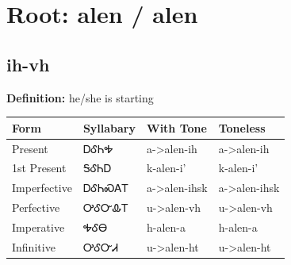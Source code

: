 \documentclass{article}%
\begin{document}
%
\normalsize%
\section*{Root: alen / alen}%
\subsection*{ih-vh}%
\textbf{Definition: }%
he/she is starting%
\\[0.5em]%
\begin{tabular}{|l|l|l|l|}%
\hline%
\textbf{Form}&\textbf{Syllabary}&\textbf{With Tone}&\textbf{Toneless}\\%
\hline%
Present&ᎠᎴᏂᎭ&a{-}>alen{-}ih&a{-}>alen{-}ih\\%
1st Present&ᎦᎴᏂᎠ&k{-}alen{-}i'&k{-}alen{-}i'\\%
Imperfective&ᎠᎴᏂᏍᎪᎢ&a{-}>alen{-}ihsk&a{-}>alen{-}ihsk\\%
Perfective&ᎤᎴᏅᎲᎢ&u{-}>alen{-}vh&u{-}>alen{-}vh\\%
Imperative&ᎭᎴᎾ&h{-}alen{-}a&h{-}alen{-}a\\%
Infinitive&ᎤᎴᏅᏗ&u{-}>alen{-}ht&u{-}>alen{-}ht\\%
\hline%
\end{tabular}%
\\[1em]%
\end{document}
